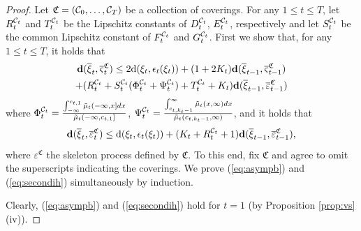 \documentclass{article}              %
\begin{document}
\begin{proof}
Let $\mathfrak{C}=(\mathcal{C}_{0},\dots,\mathcal{C}_{T})$ be a collection of coverings.
For any $1\leq t\leq T$, let $R_{t}^{\mathcal{C}_{t}}$ and $T_{t}^{\mathcal{C}_{t}}$
be the Lipschitz constants of $D_{t}^{\mathcal{C}_{t}}$, $E_{t}^{\mathcal{C}_{t}}$, respectively
and let $S_{t}^{\mathcal{C}_{t}}$ be the common Lipschitz constant of $F_{t}^{\mathcal{C}_{t}}$
and $G_{t}^{\mathcal{C}_{t}}$. First we show that, for any $1\leq t\leq T$, it holds that
\begin{multline}
\mathbf{d}(\overline{\xi}_{t},\overline{\varsigma}_{t}^{\mathfrak{C}})\leq2\mathrm{d}(\xi_{t},\epsilon_{t}(\xi_{t}))+(1+2K_{t})\mathbf{d}(\overline{\xi}_{t-1},\overline{\varsigma}_{t-1}^{\mathfrak{C}})\\
+(R_{t}^{\mathcal{C}_{t}}+S_{t}^{\mathcal{C}_{t}}(\Phi_{t}^{\mathcal{C}_{t}}+\Psi_{t}^{\mathcal{C}_{t}})+T_{t}^{\mathcal{C}_{t}}+K_{t})\mathbf{d}(\overline{\xi}_{t-1},\overline{\varepsilon}_{t-1}^{\mathfrak{C}})\label{eq:asympb}
\end{multline}
where $\Phi_{t}^{\mathcal{C}_{t}}=\frac{\int_{-\infty}^{c_{t,1}}\tilde{\mu}_{t}(-\infty,x]dx}{\tilde{\mu}_{t}(-\infty,c_{t,1}]}$,
$\Psi_{t}^{\mathcal{C}_{t}}=\frac{\int_{c_{t,k_{t}-1}}^{\infty}\tilde{\mu}_{t}(x,\infty)dx}{\tilde{\mu}_{t}(c_{t,k_{t}-1},\infty)}$,
and it holds that 
\begin{equation}
\mathbf{d}(\overline{\xi}_{t},\overline{\varepsilon}_{t}^{\mathfrak{C}})\leq\mathrm{d}(\xi_{t},\epsilon_{t}(\xi_{t}))+(K_{t}+R_{t}^{\mathcal{C}_{t}}+1)\mathbf{d}(\overline{\xi}_{t-1},\overline{\varepsilon}_{t-1}^{\mathfrak{C}}),\label{eq:secondih}
\end{equation}
where $\varepsilon^{\mathfrak{C}}$ the skeleton process defined
by $\mathfrak{C}$. To this end, fix $\mathfrak{C}$ and agree to omit the superscripts indicating
the coverings. We prove (\ref{eq:asympb}) and (\ref{eq:secondih})
simultaneously by induction. 

Clearly, (\ref{eq:asympb}) and (\ref{eq:secondih}) hold for $t=1$
(by Proposition \ref{prop:vs} (iv)).


\end{proof}
\end{document}
